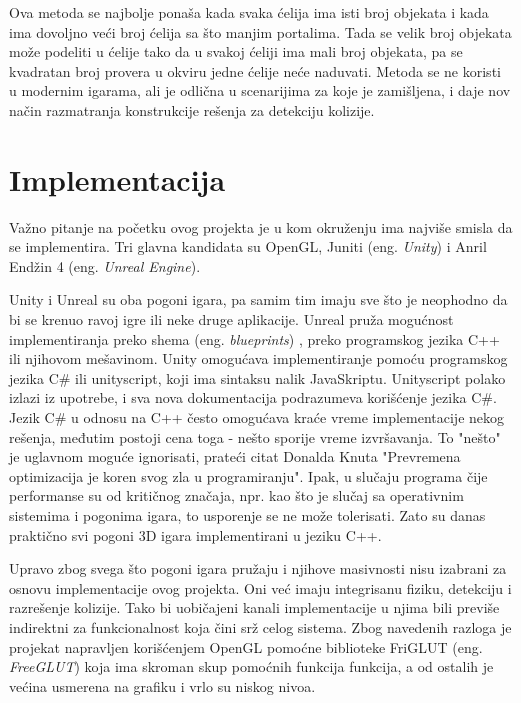 \documentclass[12pt,oneside]{memoir}
\begin{document}
Ova metoda se najbolje ponaša kada svaka ćelija ima isti broj objekata i kada ima dovoljno 
veći broj ćelija sa što manjim portalima.
Tada se velik broj objekata može podeliti u ćelije tako da u svakoj ćeliji ima mali broj objekata,
pa se kvadratan broj provera u okviru jedne ćelije neće naduvati.
Metoda se ne koristi u modernim igarama, ali je odlična u scenarijima za
koje je zamišljena, i daje nov način razmatranja konstrukcije rešenja za detekciju kolizije.

\chapter{Implementacija}
\label{sec:implementacija}

Važno pitanje na početku ovog projekta je u kom okruženju ima najviše smisla da se implementira.
Tri glavna kandidata su OpenGL, Juniti (eng. {\em Unity}) i Anril Endžin 4 (eng. {\em Unreal Engine}).

Unity i Unreal su oba pogoni igara, pa samim tim imaju sve što je neophodno da 
bi se krenuo ravoj igre ili neke druge aplikacije.
Unreal pruža mogućnost implementiranja preko shema (eng. {\em blueprints})
, preko programskog jezika C++ ili njihovom mešavinom.
Unity omogućava implementiranje pomoću programskog jezika C\# ili unityscript,
koji ima sintaksu nalik JavaSkriptu. Unityscript polako izlazi iz upotrebe, i 
sva nova dokumentacija podrazumeva korišćenje jezika C\#.
Jezik C\# u odnosu na C++ često omogućava kraće vreme implementacije nekog rešenja,
međutim postoji cena toga - nešto sporije vreme izvršavanja.
To "nešto" je uglavnom moguće ignorisati, prateći citat Donalda Knuta 
"Prevremena optimizacija je koren svog zla u programiranju".
Ipak, u slučaju programa čije performanse su od kritičnog značaja, npr. kao što je 
slučaj sa operativnim sistemima i pogonima igara, to usporenje se ne može tolerisati.
Zato su danas praktično svi pogoni 3D igara implementirani u jeziku C++.

Upravo zbog svega što pogoni igara pružaju i njihove masivnosti nisu izabrani
za osnovu implementacije ovog projekta. Oni već imaju integrisanu fiziku, detekciju 
i razrešenje kolizije. Tako bi uobičajeni kanali implementacije u njima 
bili previše indirektni za funkcionalnost koja čini srž celog sistema.
Zbog navedenih razloga je projekat napravljen korišćenjem OpenGL pomoćne 
biblioteke FriGLUT (eng. {\em FreeGLUT}) koja ima skroman skup pomoćnih funkcija
funkcija, a od ostalih je većina usmerena na grafiku i vrlo su niskog nivoa.
\end{document}
